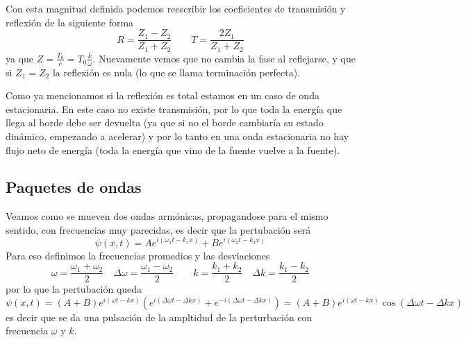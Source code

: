 \documentclass[a4paper]{article}
\numberwithin{equation}{section}
\begin{document}
			Con esta magnitud definida podemos reescribir los coeficientes de transmisión y reflexión de la siguiente forma
			\begin{equation}
				R = \frac{Z_1 - Z_2}{Z_1 + Z_2} \qquad T = \frac{2 Z_1}{Z_1 + Z_2}
				\label{eq:ondas_reflexion_coeficientes_impedancia}
			\end{equation}
			ya que $Z = \frac{T_0}{c} = T_0 \frac{k}{\omega}$. Nuevamente vemos que no cambia la fase al reflejarse, y que si $Z_1 = Z_2$ la reflexión es nula (lo que se llama terminación perfecta).
			
			Como ya mencionamos si la reflexión es total estamos en un caso de onda estacionaria. En este caso no existe transmisión, por lo que toda la energía que llega al borde debe ser devuelta (ya que si no el borde cambiaría su estado dinámico, empezando a acelerar) y por lo tanto en una onda estacionaria no hay flujo neto de energía (toda la energía que vino de la fuente vuelve a la fuente).
		\subsection{Paquetes de ondas}
			Veamos como se mueven dos ondas armónicas, propagandose para el mismo sentido, con frecuencias muy parecidas, es decir que la pertubación será
			\begin{equation*}
				\psi(x,t) = A e^{i(\omega_1 t - k_1 x)} + B e^{i(\omega_2 t - k_2 x)}
			\end{equation*}
			Para eso definimos la frecuencias promedios y las desviaciones
			\begin{equation}
				\omega = \frac{\omega_1 + \omega_2}{2} \quad \Delta \omega = \frac{\omega_1 - \omega_2}{2} \qquad k = \frac{k_1 + k_2}{2} \quad \Delta k = \frac{k_1 - k_2}{2}
				\label{eq:ondas_paquetes_batidos_frecuencias}
			\end{equation}
			por lo que la pertubación queda
			\begin{equation}
				\psi(x,t) = (A + B) e^{i (\omega t - k x)} \left(e^{i(\Delta \omega t - \Delta k x)} + e^{-i(\Delta \omega t - \Delta k x)}\right) = (A + B) e^{i(\omega t - k x)} \cos(\Delta \omega t - \Delta k x)
				\label{eq:ondas_paquetes_batidos}
			\end{equation}
			es decir que se da una pulsación de la ampltidud de la perturbación con frecuencia $\omega$ y $k$. 
			
\end{document}
